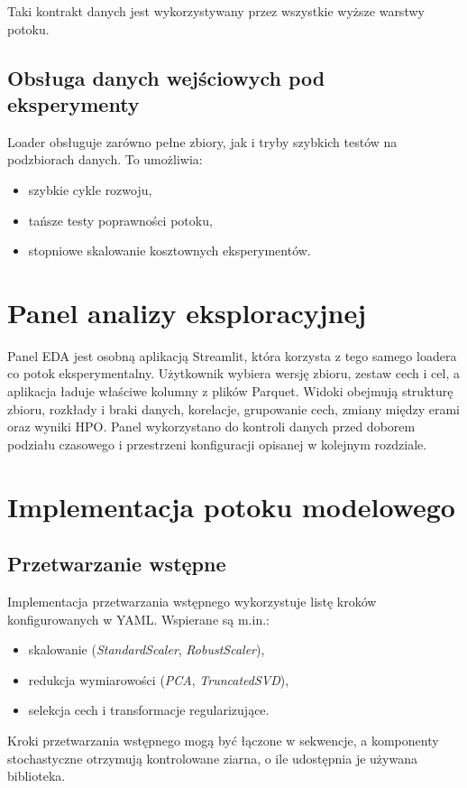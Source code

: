 \documentclass[12pt,a4paper]{report}
\begin{document}
Taki kontrakt danych jest wykorzystywany przez wszystkie wyższe warstwy potoku.

\subsection{Obsługa danych wejściowych pod eksperymenty}
Loader obsługuje zarówno pełne zbiory, jak i tryby szybkich testów na podzbiorach danych.
To umożliwia:
\begin{itemize}\item szybkie cykle rozwoju,
\item tańsze testy poprawności potoku,
\item stopniowe skalowanie kosztownych eksperymentów.\end{itemize}

\section{Panel analizy eksploracyjnej}
Panel EDA jest osobną aplikacją Streamlit, która korzysta z tego samego loadera co
potok eksperymentalny. Użytkownik wybiera wersję zbioru, zestaw cech i cel, a
aplikacja ładuje właściwe kolumny z plików Parquet. Widoki obejmują strukturę
zbioru, rozkłady i braki danych, korelacje, grupowanie cech, zmiany między erami
oraz wyniki HPO. Panel wykorzystano do kontroli danych przed doborem podziału
czasowego i przestrzeni konfiguracji opisanej w kolejnym rozdziale.

\section{Implementacja potoku modelowego}
\subsection{Przetwarzanie wstępne}
Implementacja przetwarzania wstępnego wykorzystuje listę kroków konfigurowanych w YAML.
Wspierane są m.in.:
\begin{itemize}\item skalowanie (\textit{StandardScaler}, \textit{RobustScaler}),
\item redukcja wymiarowości (\textit{PCA}, \textit{TruncatedSVD}),
\item selekcja cech i transformacje regularizujące.\end{itemize}

Kroki przetwarzania wstępnego mogą być łączone w sekwencje, a komponenty stochastyczne
otrzymują kontrolowane ziarna, o ile udostępnia je używana biblioteka.
\end{document}
